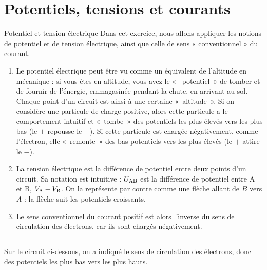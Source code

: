 \documentclass[../main/main.tex]{subfiles}
\begin{document}
\section{Potentiels, tensions et courants}

\begin{defi}{Potentiel et tension électrique}
	Dans cet exercice, nous allons appliquer les notions de potentiel et de
    tension électrique, ainsi que celle de sens « conventionnel » du courant.
	\begin{enumerate}
        \item Le potentiel électrique peut être vu comme un équivalent de
            l'altitude en mécanique : si vous êtes en altitude, vous avez le «~
            potentiel~» de tomber et de fournir de l'énergie, emmagasinée
            pendant la chute, en arrivant au sol. Chaque point d'un circuit est
            ainsi à une certaine «~altitude~». Si on considère une particule de
            charge positive, alors cette particule a le comportement intuitif et
            «~tombe~» des potentiels les plus élevés vers les plus bas (le $+$
            repousse le $+$). Si cette particule est chargée négativement, comme
            l'électron, elle «~remonte~» des bas potentiels vers les plus élevés
            (le $+$ attire le $-$).
        \item La tension électrique est la différence de potentiel entre deux
            points d'un circuit. Sa notation est intuitive : $U_{\rm AB}$ est la
            différence de potentiel entre A et B, $V_{\rm A} - V_{\rm B}$. On la
            représente par contre comme une flèche allant de $B$ vers $A$ : la
            flèche suit les potentiels croissants.
        \item Le sens conventionnel du courant positif est alors l'inverse du
            sens de circulation des électrons, car ils sont chargés
            négativement.
	\end{enumerate}
\end{defi}

\subsection{}
Sur le circuit ci-dessous, on a indiqué le sens de circulation des électrons,
donc des potentiels les plus bas vers les plus hauts.
\end{document}

